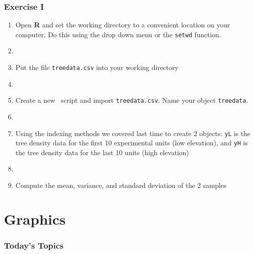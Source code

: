 \documentclass[color=usenames,dvipsnames]{beamer}\usepackage[]{graphicx}\usepackage[]{color}
\newcommand{\inr}[1]{\colorbox{inlinecolor}{\texttt{#1}}}
\begin{document}
\begin{frame}[fragile]
  \frametitle{Exercise I}
  \begin{enumerate}[\bf (1)]
    \item<1-> Open {\bf R} and set the working directory to a convenient
      location on your computer. Do this using the drop down menu or
      the \inr{setwd} function.   
    \item[]
    \item<2-> Put the file {\tt treedata.csv} into your working directory
    \item[]
    \item<3-> Create a new \R~script and import {\tt treedata.csv}. Name your object {\tt treedata}.
    \item[]
    \item<4-> Using the indexing methods we covered last time to
      create 2 objects: \inr{yL} is the tree density data for the
      first 10 experimental units (low elevation), and \inr{yH} is
      the tree density data for the last 10 units (high elevation)
    \item[]
    \item<5-> Compute the mean, variance, and standard deviation of the 2 samples
  \end{enumerate}
\end{frame}









\section{Graphics}



\begin{frame}[plain]
  \frametitle{Today's Topics}
  \Large
\end{frame}
\end{document}
